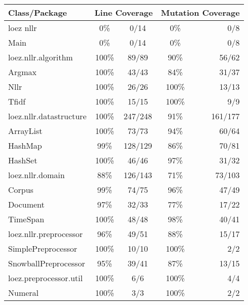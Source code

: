 \documentclass[12pt,a4paper]{article}
\begin{document}
\begin{tabular}{l |c |c |c |r}
\textbf{Class/Package}		&	\multicolumn{2}{|c}{\textbf{Line Coverage}} & \multicolumn{2}{|c}{\textbf{Mutation Coverage}} \\
\hline
loez nllr				&	0\%	 	& 0/14		& 0\%	& 0/8 	\\
\hspace{10 mm}Main 		&	0\%	 	& 0/14		& 0\%	& 0/8 	\\
\hline
loez.nllr.algorithm	&	100\% 	& 89/89 		& 90\%	& 56/62 	\\
\hspace{10 mm}Argmax			&	100\%	& 43/43		& 84\%	& 31/37 \\
\hspace{10 mm}Nllr			&	100\%	& 26/26		& 100\% 	& 13/13 \\
\hspace{10 mm}Tfidf			&	100\%	& 15/15		& 100\%	& 9/9 \\ 
\hline
loez.nllr.datastructure&	100\%	& 247/248	& 91\%	& 161/177 \\
\hspace{10 mm}ArrayList		&	100\%	&	73/73	& 94\%	&	60/64 \\
\hspace{10 mm}HashMap		&	99\%		&	128/129	& 86\%	&	70/81 \\
\hspace{10 mm}HashSet		&	100\%	&	46/46	& 97\%	&	31/32 \\
\hline
loez.nllr.domain & 88\%	&	126/143 	& 	71\%		&	73/103 \\
\hspace{10 mm}Corpus	&	99\%	&	74/75	&	96\%		&	47/49 \\
\hspace{10 mm}Document	&	97\%	&	32/33	&	77\%		&	17/22 \\
\hspace{10 mm}TimeSpan	&	100\%	&	48/48	&	98\%		&	40/41 \\
\hline
loez.nllr.preprocessor & 96\% & 49/51 & 88\% & 15/17 \\
\hspace{10 mm}SimplePreprocessor & 100\% & 10/10 & 100\% & 2/2 \\
\hspace{10 mm}SnowballPreprocessor & 95\% & 39/41 & 87\% & 13/15 \\ 
\hline
loez.preprocessor.util & 100\% & 6/6 & 100\% & 4/4 \\
\hspace{10 mm}Numeral & 100\% & 3/3 & 100\% & 2/2 \\

\end{tabular}
\end{document}
